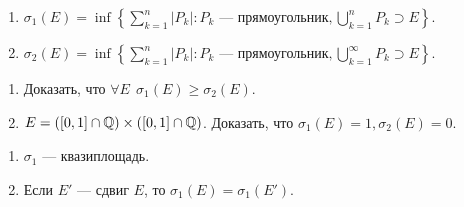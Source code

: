 \begin{example}
    \slashn
     \begin{enumerate}
         \item $\sigma_1(E) = \inf \left\{\sum\limits_{k=1}^n |P_k|\!: P_k\text{ --- прямоугольник}, \bigcup\limits_{k=1}^n P_k \supset E\right\}$.
         \item $\sigma_2(E) = \inf \left\{\sum\limits_{k=1}^n |P_k|\!: P_k\text{ --- прямоугольник}, \bigcup\limits_{k=1}^\infty P_k  \supset E\right\}$.
    \end{enumerate}
\end{example}
\begin{exerc}
    \slashn
    \begin{enumerate}
        \item Доказать, что $\forall E\ \ \sigma_1(E) \ge \sigma_2(E)$.
        \item $E = \left([0, 1] \cap \mathbb{Q}\right) \times \left([0, 1] \cap \mathbb{Q}\right)$. Доказать, что  $\sigma_1(E) = 1, \sigma_2(E) = 0$.
    \end{enumerate}
\end{exerc}
\begin{theorem}
    \slashn
     \begin{enumerate}
         \item $\sigma_1$ --- квазиплощадь.
         \item Если  $E'$ --- сдвиг  $E$, то  $\sigma_1(E) = \sigma_1(E')$.
     \end{enumerate}
\end{theorem}
